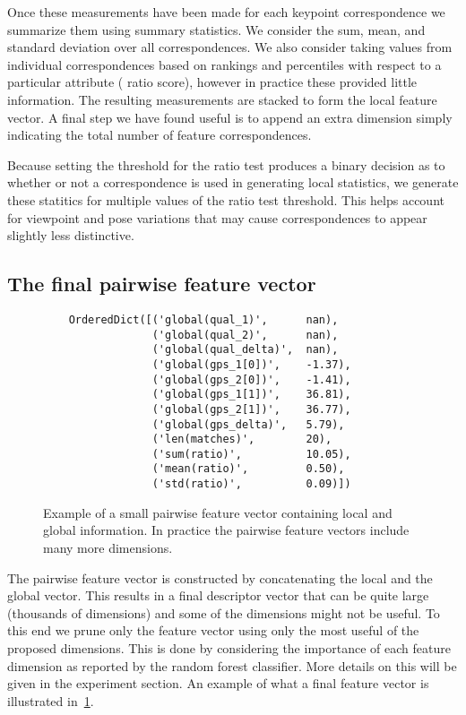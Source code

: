 Once these measurements have been made for each keypoint correspondence we
  summarize them using summary statistics.
We consider the sum, mean, and standard deviation over all correspondences.
We also consider taking values from individual correspondences based on
  rankings and percentiles with respect to a particular attribute (\eg{} ratio
  score), however in practice these provided little information.
The resulting measurements are stacked to form the local feature vector.
A final step we have found useful is to append an extra dimension simply
  indicating the total number of feature correspondences.

Because setting the threshold for the ratio test produces a binary decision as
  to whether or not a correspondence is used in generating local statistics, we
  generate these statitics for multiple values of the ratio test threshold.
This helps account for viewpoint and pose variations that may cause
  correspondences to appear slightly less distinctive.

\subsection{The final pairwise feature vector}

\begin{figure}
\begin{verbatim}
    OrderedDict([('global(qual_1)',      nan),
                 ('global(qual_2)',      nan),
                 ('global(qual_delta)',  nan),
                 ('global(gps_1[0])',    -1.37),
                 ('global(gps_2[0])',    -1.41),
                 ('global(gps_1[1])',    36.81),
                 ('global(gps_2[1])',    36.77),
                 ('global(gps_delta)',   5.79),
                 ('len(matches)',        20),
                 ('sum(ratio)',          10.05),
                 ('mean(ratio)',         0.50),
                 ('std(ratio)',          0.09)])
\end{verbatim}
\caption[A pairwise feature vector]{
Example of a small pairwise feature vector containing local and global
information. In practice the pairwise feature vectors include many more
dimensions.
}
\label{fig:PairFeatVec}
\end{figure}

The pairwise feature vector is constructed by concatenating the local and the
  global vector.
This results in a final descriptor vector that can be quite large (thousands
  of dimensions) and some of the dimensions might not be useful.
To this end we prune only the feature vector using only the most useful of the
  proposed dimensions.
This is done by considering the importance of each feature dimension as
  reported by the random forest classifier.
More details on this will be given in the experiment section.
An example of what a final feature vector is illustrated
  in~\cref{fig:PairFeatVec}.



